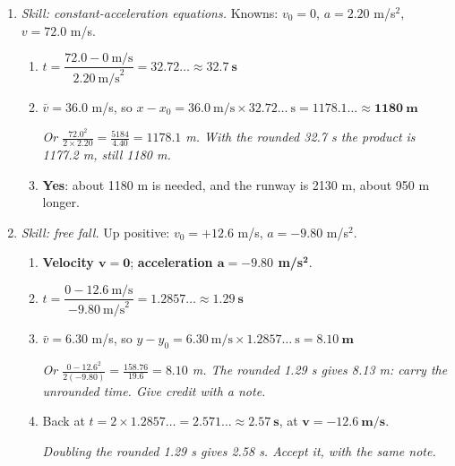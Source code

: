 \documentclass[12pt, twoside]{article}
\begin{document}
\begin{enumerate}[itemsep=0.5cm]
\begin{enumerate}[itemsep=0.3cm]
      average speed $= \dfrac{39~\text{m}}{21.0~\text{s}} = 1.857\ldots \approx
      \mathbf{1.9~\textbf{m/s}}$ \qquad
      $\bar{v} = \dfrac{-9~\text{m}}{21.0~\text{s}} = -0.428\ldots \approx
      \mathbf{-0.43~\textbf{m/s}}$, that is, 0.43 m/s west
  \end{enumerate}

\item \emph{Skill: constant-acceleration equations.} Knowns: $v_0 = 0$,
  $a = 2.20$ m/s$^2$, $v = 72.0$ m/s.
  \begin{enumerate}[itemsep=0.3cm]
    \item $t = \dfrac{72.0 - 0~\text{m/s}}{2.20~\text{m/s}^2} = 32.72\ldots \approx
      \mathbf{32.7~\textbf{s}}$
    \item $\bar{v} = 36.0$ m/s, so $x - x_0 = 36.0~\text{m/s} \times
      32.72\ldots~\text{s} = 1178.1\ldots \approx \mathbf{1180~\textbf{m}}$

      \emph{Or $\frac{72.0^2}{2 \times 2.20} = \frac{5184}{4.40} = 1178.1$ m. With
      the rounded 32.7 s the product is 1177.2 m, still 1180 m.}
    \item \textbf{Yes}: about 1180 m is needed, and the runway is 2130 m, about
      950 m longer.
  \end{enumerate}

\item \emph{Skill: free fall.} Up positive: $v_0 = +12.6$ m/s, $a = -9.80$ m/s$^2$.
  \begin{enumerate}[itemsep=0.3cm]
    \item \textbf{Velocity $\mathbf{v = 0}$}; \textbf{acceleration
      $\mathbf{a = -9.80}$ m/s$^\mathbf{2}$}.
    \item $t = \dfrac{0 - 12.6~\text{m/s}}{-9.80~\text{m/s}^2} = 1.2857\ldots
      \approx \mathbf{1.29~\textbf{s}}$
    \item $\bar{v} = 6.30$ m/s, so $y - y_0 = 6.30~\text{m/s} \times
      1.2857\ldots~\text{s} = \mathbf{8.10~\textbf{m}}$

      \emph{Or $\frac{0 - 12.6^2}{2(-9.80)} = \frac{158.76}{19.6} = 8.10$ m. The
      rounded 1.29 s gives 8.13 m: carry the unrounded time. Give credit with a
      note.}
    \item Back at $t = 2 \times 1.2857\ldots = 2.571\ldots \approx
      \mathbf{2.57~\textbf{s}}$, at $\mathbf{v = -12.6~\textbf{m/s}}$.

      \emph{Doubling the rounded 1.29 s gives 2.58 s. Accept it, with the same
      note.}
  \end{enumerate}


\end{enumerate}
\end{document}
